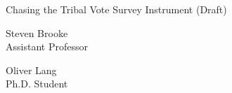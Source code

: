 \documentclass[12pt]{article}
\begin{document}
\begin{center}
\large{Chasing the Tribal Vote Survey Instrument (Draft)}\\ 

\vspace{-.75em}
\normalsize{
}
\vspace{.75em}
\end{center}
\noindent
\begin{small}
\begin{minipage} [H] {0.49\textwidth}
\singlespace
\begin{center}
Steven Brooke\\
Assistant Professor\\ %
\end{center}
\end{minipage}
\hspace{\fill}
\begin{minipage} [H] {0.49\textwidth}
\singlespace
\begin{center}
Oliver Lang\\
Ph.D. Student\\ %
\end{center}
\end{minipage}
\end{small}

\normalsize

\end{document}
